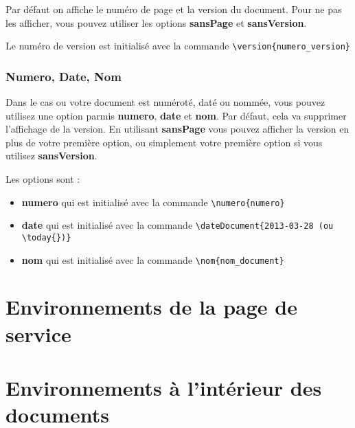 \documentclass[asi,compacte,brouillon]{picINSA}
\begin{document}
Par défaut on affiche le numéro de page et la version du document. Pour ne pas les afficher, vous pouvez utiliser les options \textbf{sansPage} et \textbf{sansVersion}.

Le numéro de version est initialisé avec la commande \verb+\version{numero_version}+

\subsection{Numero, Date, Nom}

Dans le cas ou votre document est numéroté, daté ou nommée, vous pouvez utilisez une option parmis \textbf{numero}, \textbf{date} et \textbf{nom}. Par défaut, cela va supprimer l'affichage de la version. En utilisant \textbf{sansPage} vous pouvez afficher la version en plus de votre première option, ou simplement votre première option si vous utilisez \textbf{sansVersion}.

Les options sont :
\begin{itemize}
\item \textbf{numero} qui est initialisé avec la commande \verb+\numero{numero}+
\item \textbf{date} qui est initialisé avec la commande \verb+\dateDocument{2013-03-28 (ou \today{})}+
\item \textbf{nom} qui est initialisé avec la commande \verb+\nom{nom_document}+
\end{itemize}


\chapter{Environnements de la page de service}

\chapter{Environnements à l'intérieur des documents}
\end{document}
